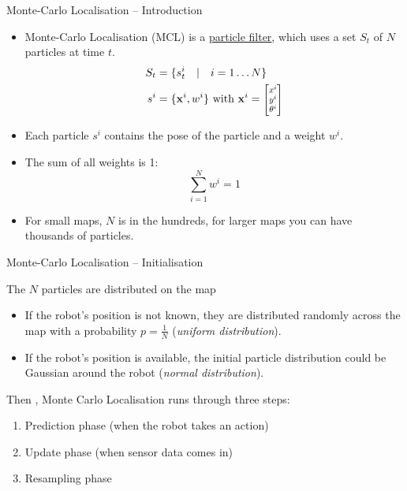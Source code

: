 \documentclass[compress]{beamer}
\newcommand{\colvec}[2][.8]{%
  \scalebox{#1}{%
    \renewcommand{\arraystretch}{.8}%
    $\begin{bmatrix}#2\end{bmatrix}$%
  }
}
\begin{document}

\begin{frame}{Monte-Carlo Localisation -- Introduction}

    \begin{itemize}
        \item Monte-Carlo Localisation (MCL) is a \href{http://en.wikipedia.org/wiki/Particle_filter}{particle
            filter}, which uses a set $S_t$ of $N$ particles at time
            $t$.
            \large
            \begin{align*}
                S_t &= \{s_t^i \quad|\quad i = 1\ldots N\} \\
                s^i &= \{\mathbf{x}^i, w^i\} \text{ with } \mathbf{x}^i =
                \colvec{x^i \\ y^i \\ \theta^i}
            \end{align*}
            \normalsize
        \item<+-> Each particle $s^i$ contains the pose of the particle and a weight $w^i$.
        \item<+-> The sum of all weights is 1: \[ \sum_{i=1}^N w^i = 1 \]
        \item<+-> For small maps, $N$ is in the hundreds, for larger maps you
            can have thousands of particles.
    \end{itemize}

\end{frame}

\begin{frame}{Monte-Carlo Localisation -- Initialisation}

    The $N$ particles are distributed on the map

    \begin{itemize}
        \item If the robot's position is not known, they are distributed randomly
            across the map with a probability $p=\frac{1}{N}$ (\emph{uniform
            distribution}).
            \pause
        \item If the robot's position is available, the initial particle
            distribution could be Gaussian around the robot (\emph{normal
            distribution}).
    \end{itemize}

    \pause 

    Then , Monte Carlo Localisation runs through three steps:

    \begin{enumerate}
        \item Prediction phase (when the robot takes an action)
        \item Update phase (when sensor data comes in)
        \item Resampling phase
    \end{enumerate}

\end{frame}
\end{document}

